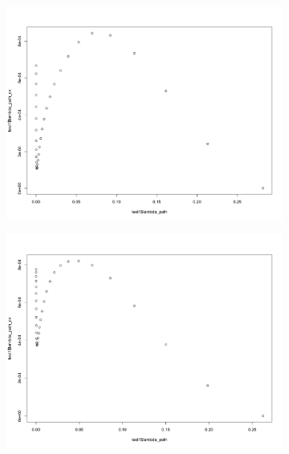 \documentclass[letterpaper]{article}
\begin{document}
\begin{figure}[H]
\centering
\begin{subfigure}{0.5\textwidth}
  \centering
  \includegraphics[width=1\linewidth]{./result_plot/cv_square/1wrong_path_plot}
\end{subfigure}%
\begin{subfigure}{.5\textwidth}
  \centering
  \includegraphics[width=1\linewidth]{./result_plot/cv_square/2wrong_path_plot}
\end{subfigure}

\end{figure}
\end{document}
